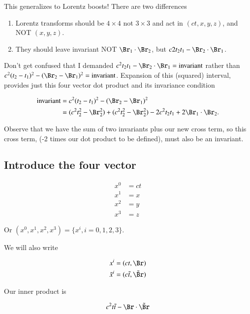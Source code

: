 This generalizes to Lorentz boosts!  There are two differences

\begin{enumerate}
\item Lorentz transforms should be $4 \times 4$ not $3 \times 3$ and act in $(ct, x, y, z)$, and NOT $(x,y,z)$.
\item They should leave invariant NOT $\Br_1 \cdot \Br_2$, but $c2 t_2 t_1 - \Br_2 \cdot \Br_1$.
\end{enumerate}

Don't get confused that I demanded $c^2 t_2 t_1 - \Br_2 \cdot \Br_1 = \text{invariant}$ rather than $c^2 (t_2 - t_1)^2 - (\Br_2 - \Br_1)^2 = \text{invariant}$.  Expansion of this (squared) interval, provides just this four vector dot product and its invariance condition

\begin{align*}
\text{invariant} 
&=
c^2 (t_2 - t_1)^2 - (\Br_2 - \Br_1)^2 \\
&=
(c^2 t_2^2 - \Br_2^2) + (c^2 t_2^2 - \Br_2^2)
- 2 c^2 t_2 t_1 + 2 \Br_1 \cdot \Br_2.
\end{align*}

Observe that we have the sum of two invariants plus our new cross term, so this cross term, (-2 times our dot product to be defined), must also be an invariant.

\subsection{Introduce the four vector}

\begin{align*}
x^0 &= ct \\
x^1 &= x \\
x^2 &= y \\
x^3 &= z 
\end{align*}

Or $(x^0, x^1, x^2, x^3) = \{ x^i, i = 0,1,2,3 \}$.

We will also write

\begin{align*}
x^i &= (ct, \Br) \\
\tilde{x}^i &= (c\tilde{t}, \tilde{\Br})
\end{align*}

Our inner product is

\begin{equation}\label{eqn:relativisticElectrodynamicsL6:20}
c^2 t \tilde{t} - \Br \cdot \tilde{\Br}
\end{equation}

